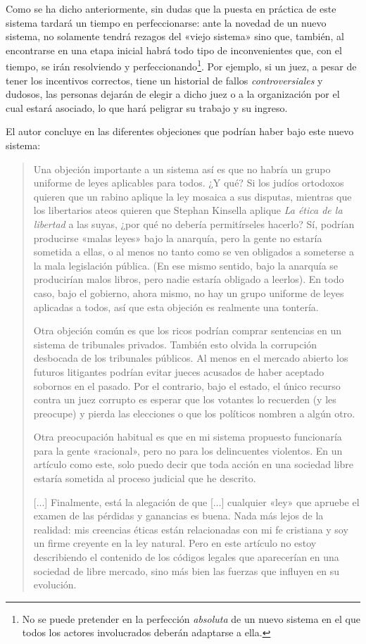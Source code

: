 \documentclass[12pt,a4paper,twoside]{book}
\begin{document}
Como se ha dicho anteriormente, sin dudas que la puesta en práctica de este sistema tardará un tiempo en perfeccionarse: ante la novedad de un nuevo sistema, no solamente tendrá rezagos del «viejo sistema» sino que, también, al encontrarse en una etapa inicial habrá todo tipo de inconvenientes que, con el tiempo, se irán resolviendo y perfeccionando\footnote{No se puede pretender en la perfección \textit{absoluta} de un nuevo sistema en el que todos los actores involucrados deberán adaptarse a ella.}. Por ejemplo, si un juez, a pesar de tener los incentivos correctos, tiene un historial de fallos \textit{controversiales} y dudosos, las personas dejarán de elegir a dicho juez o a la organización por el cual estará asociado, lo que hará peligrar su trabajo y su ingreso.

El autor concluye en las diferentes objeciones que podrían haber bajo este nuevo sistema:

\begin{quotation}
Una objeción importante a un sistema así es que no habría un grupo uniforme de leyes aplicables para todos. ¿Y qué? Si los judíos ortodoxos quieren que un rabino aplique la ley mosaica a sus disputas, mientras que los libertarios ateos quieren que Stephan Kinsella aplique \textit{La ética de la libertad} a las suyas, ¿por qué no debería permitírseles hacerlo? Sí, podrían producirse «malas leyes» bajo la anarquía, pero la gente no estaría sometida a ellas, o al menos no tanto como se ven obligados a someterse a la mala legislación pública. (En ese mismo sentido, bajo la anarquía se producirían malos libros, pero nadie estaría obligado a leerlos). En todo caso, bajo el gobierno, ahora mismo, no hay un grupo uniforme de leyes aplicadas a todos, así que esta objeción es realmente una tontería.

Otra objeción común es que los ricos podrían comprar sentencias en un sistema de tribunales privados. También esto olvida la corrupción desbocada de los tribunales públicos. Al menos en el mercado abierto los futuros litigantes podrían evitar jueces acusados de haber aceptado sobornos en el pasado. Por el contrario, bajo el estado, el único recurso contra un juez corrupto es esperar que los votantes lo recuerden (y les preocupe) y pierda las elecciones o que los políticos nombren a algún otro.

Otra preocupación habitual es que en mi sistema propuesto funcionaría para la gente «racional», pero no para los delincuentes violentos. En un artículo como este, solo puedo decir que toda acción en una sociedad libre estaría sometida al proceso judicial que he descrito.

[...] Finalmente, está la alegación de que [...] cualquier «ley» que apruebe el examen de las pérdidas y ganancias es buena. Nada más lejos de la realidad: mis creencias éticas están relacionadas con mi fe cristiana y soy un firme creyente en la ley natural. Pero en este artículo no estoy describiendo el contenido de los códigos legales que aparecerían en una sociedad de libre mercado, sino más bien las fuerzas que influyen en su evolución.  \cite{justicia-privada}
\end{quotation}
\end{document}
